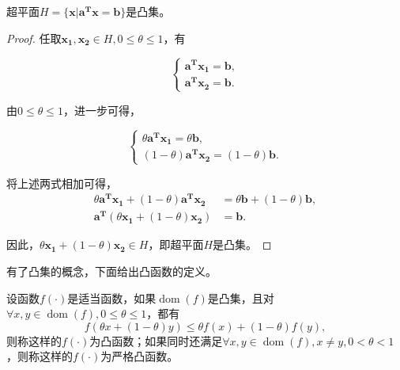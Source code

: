\begin{problem}
    超平面$H=\{\bm{x}|\bm{a^{T}}\bm{x}=\bm{b}\}$是凸集。
\end{problem}
\begin{proof}
    任取$\bm{x_{1}}, \bm{x_{2}}\in H, 0 \leq \theta \leq 1$，有
    
    \begin{equation*}
        \begin{cases}
            \bm{a^{T}x_{1}} = \bm{b}, \\
            \bm{a^{T}x_{2}} = \bm{b}.
        \end{cases}
    \end{equation*}

    由$0\leq \theta \leq 1$，进一步可得，
    
    \begin{equation*}
        \begin{cases}
            \theta \bm{a^{T}x_{1}} = \theta \bm{b}, \\
            (1-\theta) \bm{a^{T}x_{2}} = (1-\theta) \bm{b}.
        \end{cases}
    \end{equation*}

    将上述两式相加可得，
    \begin{equation*}
        \begin{split}
            \theta \bm{a^{T}x_{1}} + (1-\theta) \bm{a^{T}x_{2}} &= \theta \bm{b} + (1-\theta) \bm{b} ,\\
            \bm{a^{T}} (\theta \bm{x_{1}}+(1-\theta)\bm{x_{2}}) &= \bm{b} .
        \end{split}
    \end{equation*}

    因此，$\theta \bm{x_{1}}+(1-\theta)\bm{x_{2}} \in H$，即超平面$H$是凸集。
\end{proof}

有了凸集的概念，下面给出凸函数的定义。

\begin{definition}
    设函数$f(\cdot)$是适当函数，如果$\mathop{\mathrm{dom}} (f)$是凸集，且对$\forall x, y\in \mathop{\mathrm{dom}} (f), 0\leq \theta \leq 1$，都有
    \begin{equation}
        f(\theta x+(1-\theta)y) \leq \theta f(x) + (1-\theta)f(y),
    \end{equation}
    则称这样的$f(\cdot)$为凸函数；如果同时还满足$\forall x, y\in \mathop{\mathrm{dom}} (f), x \neq y, 0<\theta<1$，则称这样的$f(\cdot)$为严格凸函数。
\end{definition}


